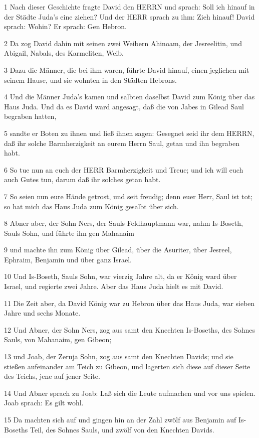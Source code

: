 \par 1 Nach dieser Geschichte fragte David den HERRN und sprach: Soll ich hinauf in der Städte Juda's eine ziehen? Und der HERR sprach zu ihm: Zieh hinauf! David sprach: Wohin? Er sprach: Gen Hebron.
\par 2 Da zog David dahin mit seinen zwei Weibern Ahinoam, der Jesreelitin, und Abigail, Nabals, des Karmeliten, Weib.
\par 3 Dazu die Männer, die bei ihm waren, führte David hinauf, einen jeglichen mit seinem Hause, und sie wohnten in den Städten Hebrons.
\par 4 Und die Männer Juda's kamen und salbten daselbst David zum König über das Haus Juda. Und da es David ward angesagt, daß die von Jabes in Gilead Saul begraben hatten,
\par 5 sandte er Boten zu ihnen und ließ ihnen sagen: Gesegnet seid ihr dem HERRN, daß ihr solche Barmherzigkeit an eurem Herrn Saul, getan und ihn begraben habt.
\par 6 So tue nun an euch der HERR Barmherzigkeit und Treue; und ich will euch auch Gutes tun, darum daß ihr solches getan habt.
\par 7 So seien nun eure Hände getrost, und seit freudig; denn euer Herr, Saul ist tot; so hat mich das Haus Juda zum König gesalbt über sich.
\par 8 Abner aber, der Sohn Ners, der Sauls Feldhauptmann war, nahm Is-Boseth, Sauls Sohn, und führte ihn gen Mahanaim
\par 9 und machte ihn zum König über Gilead, über die Asuriter, über Jesreel, Ephraim, Benjamin und über ganz Israel.
\par 10 Und Is-Boseth, Sauls Sohn, war vierzig Jahre alt, da er König ward über Israel, und regierte zwei Jahre. Aber das Haus Juda hielt es mit David.
\par 11 Die Zeit aber, da David König war zu Hebron über das Haus Juda, war sieben Jahre und sechs Monate.
\par 12 Und Abner, der Sohn Ners, zog aus samt den Knechten Is-Boseths, des Sohnes Sauls, von Mahanaim, gen Gibeon;
\par 13 und Joab, der Zeruja Sohn, zog aus samt den Knechten Davids; und sie stießen aufeinander am Teich zu Gibeon, und lagerten sich diese auf dieser Seite des Teichs, jene auf jener Seite.
\par 14 Und Abner sprach zu Joab: Laß sich die Leute aufmachen und vor uns spielen. Joab sprach: Es gilt wohl.
\par 15 Da machten sich auf und gingen hin an der Zahl zwölf aus Benjamin auf Is-Boseths Teil, des Sohnes Sauls, und zwölf von den Knechten Davids.
